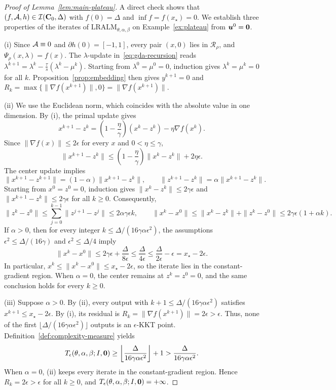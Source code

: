 \begin{proof}[Proof of Lemma~\ref{lem:main-plateau}]
A direct check shows that \((f,\mathcal{A},h)\in\mathcal I(\mathbf C_0,\Delta)\) with
\(f(0)=\Delta\) and \(\inf f=f(x_\star)=0\).
We establish three properties of the iterates of
\(\mathrm{LRALM}_{\theta,\alpha,\beta}\) on Example~\ref{ex:plateau} from
\(\bm{u}^0=\bm{0}\).

(i) Since \(\mathcal{A}\equiv0\) and \(\partial h(0)=[-1,1]\), every pair
\((x,0)\) lies in \(\mathcal R_\rho\), and \(\Psi_\rho(x,\lambda)=f(x)\). The
\(\lambda\)-update in~\eqref{eq:gda-recursion} reads
\(\lambda^{k+1}=\lambda^k-\frac{\tau}{s}(\lambda^k-\mu^k)\). Starting from
\(\lambda^0=\mu^0=0\), induction gives \(\lambda^k=\mu^k=0\) for all \(k\).
Proposition~\ref{prop:embedding} then gives \(y^{k+1}=0\) and
\(R_k=\max\{\|\nabla f(x^{k+1})\|,0\}=\|\nabla f(x^{k+1})\|\).

(ii) We use the Euclidean norm, which coincides with the absolute value
in one dimension. By (i), the primal update gives
\[
x^{k+1}-z^k
=\left(1-\frac{\eta}{\gamma}\right)(x^k-z^k)-\eta\nabla f(x^k).
\]
Since \(\|\nabla f(x)\|\le2\epsilon\) for every \(x\) and
\(0<\eta\le\gamma\),
\[
\|x^{k+1}-z^k\|
\le\left(1-\frac{\eta}{\gamma}\right)\|x^k-z^k\|+2\eta\epsilon.
\]
The center update implies
\[
\|x^{k+1}-z^{k+1}\|=(1-\alpha)\|x^{k+1}-z^k\|,
\qquad
\|z^{k+1}-z^k\|=\alpha\|x^{k+1}-z^k\|.
\]
Starting from \(x^0=z^0=0\), induction gives
\(\|x^k-z^k\|\le2\gamma\epsilon\) and
\(\|x^{k+1}-z^k\|\le2\gamma\epsilon\) for all \(k\ge0\).
Consequently,
\[
\|z^k-z^0\|
\le\sum_{j=0}^{k-1}\|z^{j+1}-z^j\|
\le2\alpha\gamma\epsilon k,
\qquad
\|x^k-x^0\|
\le\|x^k-z^k\|+\|z^k-z^0\|
\le2\gamma\epsilon(1+\alpha k).
\]
If \(\alpha>0\), then for every integer \(k\le\Delta/(16\gamma\alpha\epsilon^2)\), the
assumptions \(\epsilon^2\le\Delta/(16\gamma)\) and
\(\epsilon^2\le\Delta/4\) imply
\[
\|x^k-x^0\|
\le2\gamma\epsilon+\frac{\Delta}{8\epsilon}
\le\frac{\Delta}{4\epsilon}
\le\frac{\Delta}{2\epsilon}-\epsilon
=x_\star-2\epsilon.
\]
In particular, \(x^k\le\|x^k-x^0\|\le x_\star-2\epsilon\), so the
iterate lies in the constant-gradient region. When \(\alpha=0\), the
center remains at \(z^k=z^0=0\), and the same conclusion holds for every
\(k\ge0\).

(iii) Suppose \(\alpha>0\). By (ii), every output with
\(k+1\le\Delta/(16\gamma\alpha\epsilon^2)\) satisfies
\(x^{k+1}\le x_\star-2\epsilon\). By (i), its residual is
\(R_k=\|\nabla f(x^{k+1})\|=2\epsilon>\epsilon\).
Thus, none of the first
\(\lfloor\Delta/(16\gamma\alpha\epsilon^2)\rfloor\) outputs is an
\(\epsilon\)-KKT point. Definition~\ref{def:complexity-measure} yields
\[
T_\epsilon(\theta,\alpha,\beta;I,\bm{0})
\ge\left\lfloor\frac{\Delta}{16\gamma\alpha\epsilon^2}\right\rfloor+1
>\frac{\Delta}{16\gamma\alpha\epsilon^2}.
\]
When \(\alpha=0\), (ii) keeps every iterate in the constant-gradient region.
Hence \(R_k=2\epsilon>\epsilon\) for all \(k\ge0\), and
\(T_\epsilon(\theta,\alpha,\beta;I,\bm{0})=+\infty\).
\end{proof}

